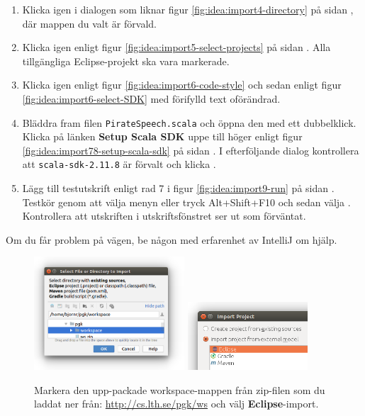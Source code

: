 \begin{enumerate}
\item Klicka  igen i dialogen som liknar figur \ref{fig:idea:import4-directory} på sidan \pageref{fig:idea:import4-directory}, där mappen du valt är förvald.

\item Klicka  igen enligt figur \ref{fig:idea:import5-select-projects} på sidan  \pageref{fig:idea:import5-select-projects}. Alla tillgängliga Eclipse-projekt ska vara markerade.

\item Klicka  igen enligt figur \ref{fig:idea:import6-code-style} och sedan   enligt figur \ref{fig:idea:import6-select-SDK} med förifylld text oförändrad.

\item Bläddra fram filen \texttt{PirateSpeech.scala} och öppna den med ett dubbelklick. Klicka på länken \textbf{Setup Scala SDK} uppe till höger enligt figur \ref{fig:idea:import78-setup-scala-sdk} på sidan \pageref{fig:idea:import78-setup-scala-sdk}. I efterföljande dialog kontrollera att \texttt{scala-sdk-2.11.8} är förvalt och klicka .

\item Lägg till testutskrift enligt rad 7 i figur \ref{fig:idea:import9-run} på sidan \pageref{fig:idea:import9-run}. Testkör genom att välja menyn  eller tryck Alt+Shift+F10 och sedan välja . Kontrollera att utskriften i utskriftsfönstret ser ut som förväntat.
\end{enumerate}

\noindent Om du får problem på vägen, be någon med erfarenhet av IntelliJ om hjälp.


\begin{figure}[h]
\centering
\includegraphics[width=0.5\textwidth]{../img/intellij/idea-import2-select.png}%
\hfill\includegraphics[width=0.4\textwidth]{../img/intellij/idea-import3-eclipse.png}

\caption{Markera den upp-packade workspace-mappen från zip-filen som du laddat ner från: \url{http://cs.lth.se/pgk/ws} och välj \textbf{Eclipse}-import.}
\label{fig:idea:import23-select}
\end{figure}

